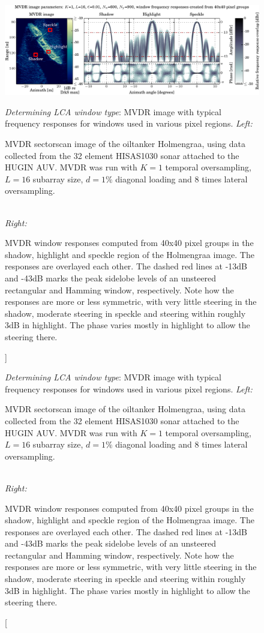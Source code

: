 \documentclass[10pt,journal,draftclsnofoot,onecolumn]{IEEEtran}
\let\MYoriglatexcaption\caption               %
\renewcommand{\caption}[2][\relax]{\MYoriglatexcaption[#2]{#2}}
\newcommand\1{\vec 1}
\begin{document}
\begin{figure}[t]\centering%
\includegraphics[width=\linewidth]{gfx/mvdr_selected_windows_holmengraa.pdf}%
\caption{\emph{Determining LCA window type}: MVDR image with typical frequency responses for windows used in various pixel regions.\newline
\emph{Left:}\hfill
\parbox[t]{.95\linewidth}{MVDR sectorscan image of the oiltanker Holmengraa, using data collected from the 32 element HISAS1030 sonar attached to the HUGIN AUV. MVDR was run with $K=1$ temporal oversampling, $L=16$ subarray size, $d=1\%$ diagonal loading and 8 times lateral oversampling.}\protect\\\hspace{\textwidth}
\emph{Right:}\hfill
\parbox[t]{.95\linewidth}{MVDR window responses computed from 40x40 pixel groups in the shadow, highlight and speckle region of the Holmengraa image. The responses are overlayed each other. The dashed red lines at -13dB and -43dB marks the peak sidelobe levels of an unsteered rectangular and Hamming window, respectively. Note how the responses are more or less symmetric, with very little steering in the shadow, moderate steering in speckle and steering within roughly 3dB in highlight. The phase varies mostly in highlight to allow the steering there.} }\label{mvdr_selected_windows}
\end{figure}
\end{document}
